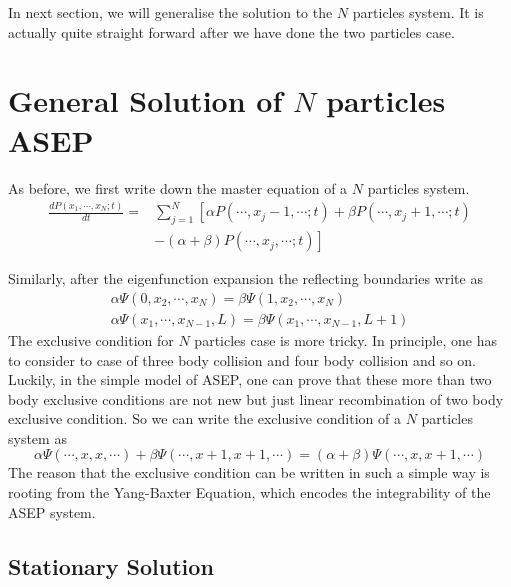 In next section, we will generalise the solution to the $N$ particles system.
It is actually quite straight forward after we have done the two particles
case. 


\section{General Solution of $N$ particles ASEP}
\label{sec:general_solution_of_n_particles_asep}

As before, we first write down the master equation of a $N$ particles system.
\begin{equation}
    \begin{aligned}
        \label{eq:masterEqN}
        \frac{d P(x_1, \cdots, x_N; t)}{dt} = & \sum_{j=1}^N \left[\alpha
            P(\cdots,x_j-1,\cdots;t) + \beta P(\cdots, x_j+1, \cdots;t)\right. \\ 
        & \left.- (\alpha+\beta)P(\cdots, x_j, \cdots; t)\right]
    \end{aligned}
\end{equation}

Similarly, after the eigenfunction expansion the reflecting boundaries write as
\begin{subequations}
    \label{eq:boundaries-N-particles}
    \begin{align}
        \alpha \Psi(0,x_2,\cdots,x_N) = \beta \Psi(1, x_2,\cdots, x_N) \\
        \alpha \Psi(x_1,\cdots, x_{N-1}, L) = \beta \Psi(x_1,\cdots, x_{N-1}, L+1)
    \end{align}
\end{subequations}
The exclusive condition for $N$ particles case is more tricky. In principle,
one has to consider to case of three body collision and four body collision and
so on. Luckily, in the simple model of ASEP, one can prove that these more than
two body exclusive conditions are not new but just linear recombination of two
body exclusive condition. So we can write the exclusive condition of a $N$
particles system as 
\begin{equation}
    \label{eq:exclusionConditionN}
    \alpha \Psi(\cdots,x, x,\cdots) + \beta \Psi(\cdots, x+1, x+1, \cdots) 
    = (\alpha + \beta) \Psi(\cdots, x, x+1, \cdots)
\end{equation}
The reason that the exclusive condition can be written in such a simple way is
rooting from the Yang-Baxter Equation, which encodes the integrability of the
ASEP system.

\subsection{Stationary Solution}
\label{sub:stationary_solution}

